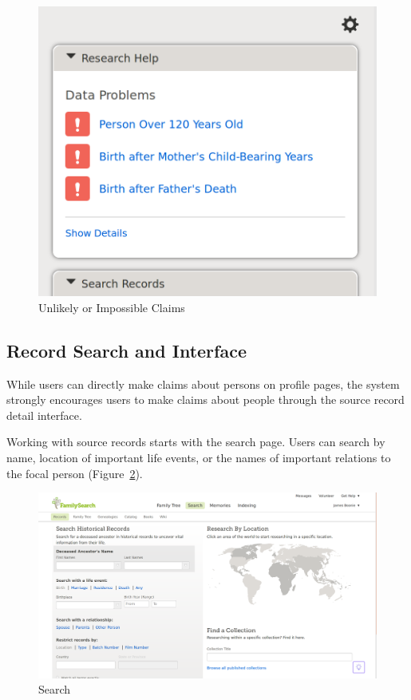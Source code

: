 \documentclass[format=siggraph, review=true]{acmart}
\begin{document}
\begin{figure}[h]
\includegraphics[width=\columnwidth]{images/familysearch/data_problems_detail.png}
\caption{Unlikely or Impossible Claims}
\label{fig:data-problems}
\end{figure}

\subsection*{Record Search and Interface}
While users can directly make claims about persons on profile pages,
the system strongly encourages users to make claims about people
through the source record detail interface.

Working with source records starts with the search page. Users can
search by name, location of important life events, or the names of
important relations to the focal person
(Figure~\ref{fig:search-record}).

\begin{figure}[h]
\includegraphics[width=\columnwidth]{images/familysearch/search-records.png}
\caption{Search}
\label{fig:search-record}
\end{figure}
\end{document}

